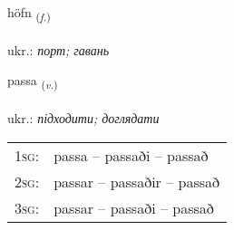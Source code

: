 \documentclass[frontgrid, backgrid]{flacards}\usepackage[]{graphicx}\usepackage[]{xcolor}
\begin{document}
\renewcommand{\flhead}{\vskip5pt \fboxsep=0pt {\small\bfseries\footnotesize Nafnorð | іменник}}
\renewcommand{\fcfoot}{\vskip5pt \fboxsep=0pt \hspace{2pt}{\small\bfseries\footnotesize 2K}}

\renewcommand{\blhead}{\vskip5pt {\small\bfseries\footnotesize Nafnorð | іменник }}
\renewcommand{\bcfoot}{\vskip5pt \hspace{2pt}{\small\bfseries\footnotesize 2K}}


{höfn \small{\textsubscript{(\textit{f.})}} \\[1ex] %
\textphonetic{[hœpn̥]} \\
ukr.: \emph{порт; гавань} \\  [2ex]
\renewcommand*{\arraystretch}{0.8}
}

\renewcommand{\flhead}{\vskip5pt \fboxsep=0pt {\small\bfseries\footnotesize Sagnorð | дієслово}}
\renewcommand{\fcfoot}{\vskip5pt \fboxsep=0pt \hspace{2pt}{\small\bfseries\footnotesize 2K}}

\renewcommand{\blhead}{\vskip5pt {\small\bfseries\footnotesize Sagnorð | дієслово }}
\renewcommand{\bcfoot}{\vskip5pt \hspace{2pt}{\small\bfseries\footnotesize 2K}}


{passa \small{\textsubscript{(\textit{v.})}} \\[1ex] %
\textphonetic{[pʰasa]} \\
ukr.: \emph{підходити; доглядати} \\  [2ex]
\renewcommand*{\arraystretch}{0.8}
\begin{tabular}{p{1cm}l}
\textsc{1sg}: & passa -- passaði -- passað \\ 
\textsc{2sg}: & passar -- passaðir -- passað \\ 
\textsc{3sg}: & passar -- passaði -- passað \\ 
\end{tabular}
}
\end{document}
